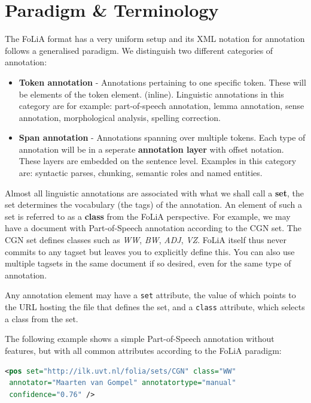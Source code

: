 \documentclass[a4paper,12pt]{report}
\begin{document}
\section{Paradigm \& Terminology}
\label{sec:paradigm}

The FoLiA format has a very uniform setup and its XML notation for annotation follows a generalised paradigm. We distinguish two different categories of annotation:

\begin{itemize}
\item \textbf{Token annotation} - Annotations pertaining to one specific token. These will be elements of the token element. (inline). Linguistic annotations in this category are for example: part-of-speech annotation, lemma annotation, sense annotation, morphological analysis, spelling correction.
\item \textbf{Span annotation} - Annotations spanning over multiple tokens. Each type of annotation will be in a seperate \textbf{annotation layer} with offset notation. These layers are embedded on the sentence level. Examples in this category are: syntactic parses, chunking, semantic roles and named entities.
\end{itemize}

Almost all linguistic annotations are associated with what we shall call a \textbf{set}, the set determines the vocabulary (the tags) of the annotation. An element of such a set is referred to as a \textbf{class} from the FoLiA perspective. For example, we may have a document with Part-of-Speech annotation according to the CGN set. The CGN set defines classes such as \emph{WW}, \emph{BW}, \emph{ADJ}, \emph{VZ}. FoLiA itself thus never commits to any tagset but leaves you to explicitly define this. You can also use multiple tagsets in the same document if so desired, even for the same type of annotation.

Any annotation element may have a \texttt{set} attribute, the value of which points to the URL hosting the file that defines the set, and a \texttt{class} attribute, which selects a class from the set.

The following example shows a simple Part-of-Speech annotation without features, but with all common attributes according to the FoLiA paradigm:

\begin{lstlisting}[language=xml]
<pos set="http://ilk.uvt.nl/folia/sets/CGN" class="WW" 
 annotator="Maarten van Gompel" annotatortype="manual"
 confidence="0.76" />
\end{lstlisting}
\end{document}
